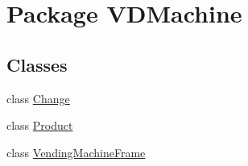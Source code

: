 \hypertarget{namespace_v_d_machine}{}\section{Package V\+D\+Machine}
\label{namespace_v_d_machine}
\subsection*{Classes}
\begin{DoxyCompactItemize}
\item 
class \hyperlink{class_v_d_machine_1_1_change}{Change}
\item 
class \hyperlink{class_v_d_machine_1_1_product}{Product}
\item 
class \hyperlink{class_v_d_machine_1_1_vending_machine_frame}{Vending\+Machine\+Frame}
\end{DoxyCompactItemize}
